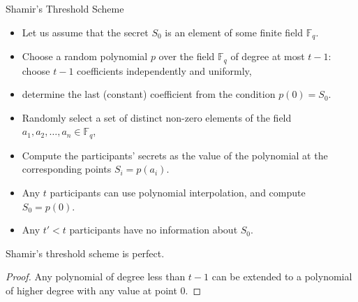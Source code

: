 \documentclass[
handout,
aspectratio=169]{beamer}
\newcommand{\pitem}{\pause\item}
\newcommand{\seqn}[2]{{#1}_1,{#1}_2,\dotsc,{#1}_{#2}}
\begin{document}
\begin{frame}{Shamir's Threshold Scheme}
    \begin{itemize}
    \item Let us assume that the secret $S_0$ is an element of some finite field $\mathbb{F}_q$.

    \pitem Choose a random polynomial $p$ over the field $\mathbb{F}_q$ of degree at most $t-1$: choose $t-1$ coefficients independently and uniformly,

    \pitem determine the last (constant) coefficient from the condition $p(0) = S_0$.

    \pitem Randomly select a set of distinct non-zero elements of the field $\seqn{a}{n} \in \mathbb{F}_q$,

    \pitem Compute the participants' secrets as the value of the polynomial at the corresponding points $S_i = p(a_i)$.

    \pitem Any $t$ participants can use polynomial interpolation, and compute $S_0 = p(0)$.

    \pitem Any $t' < t$ participants have no information about $S_0$.
    \end{itemize}

    \pause
    \begin{theorem}
        Shamir's threshold scheme is perfect.
    \end{theorem}
    \pause
    \begin{proof}
        Any polynomial of degree less than $t-1$ can be extended to a polynomial of higher degree with any value at point $0$.
        \end{proof}	\end{frame}
\end{document}
